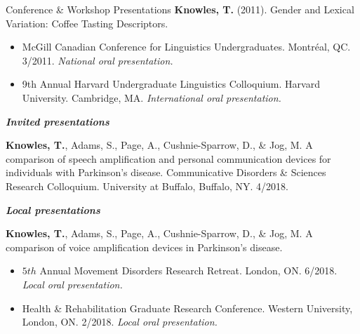 \documentclass{resume} %
\begin{document}
\begin{rSection}{Conference \& Workshop Presentations}
	{\bf Knowles, T.} (2011). Gender and Lexical Variation: Coffee Tasting Descriptors. 
	\begin{itemize}
				\renewcommand\labelitemi{$\cdot$}
		\item McGill Canadian Conference for Linguistics Undergraduates. Montr\'eal, QC. 3/2011. \emph{National oral presentation.}
		\item 9th Annual Harvard Undergraduate Linguistics Colloquium. Harvard University. Cambridge, MA. \emph{International oral presentation.}
	\end{itemize}



\begin{center}
	{\bf \emph{Invited presentations}}
\end{center}

	{\bf Knowles, T.}, Adams, S., Page, A., Cushnie-Sparrow, D., \& Jog, M. A comparison of speech amplification and personal communication devices for individuals with Parkinson's disease. Communicative Disorders \& Sciences Research Colloquium. University at Buffalo, Buffalo, NY. 4/2018.



\begin{center}
	{\bf \emph{Local presentations}}
\end{center}

	{\bf Knowles, T.}, Adams, S., Page, A., Cushnie-Sparrow, D., \& Jog, M. A comparison of voice amplification devices in Parkinson's disease. 
		\begin{itemize}
			\renewcommand\labelitemi{$\cdot$}
			\item $5th$ Annual Movement Disorders Research Retreat. London, ON. 6/2018. \emph{Local oral presentation.}
			\item Health \& Rehabilitation  Graduate Research Conference. Western University, London, ON. 2/2018. \emph{Local oral presentation.}
		\end{itemize}
		

\end{rSection}
\end{document}
